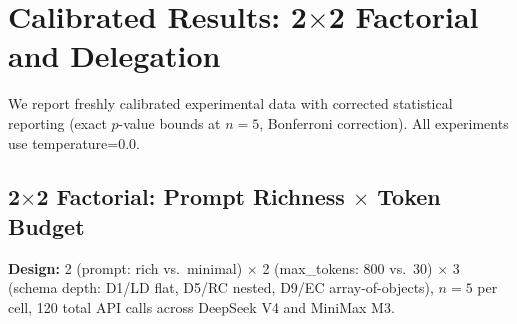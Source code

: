 \documentclass[11pt,a4paper]{article}
\begin{document}
\section{Calibrated Results: 2$\times$2 Factorial and Delegation}\label{sec:calibrated}

We report freshly calibrated experimental data with corrected statistical reporting (exact $p$-value bounds at $n=5$, Bonferroni correction). All experiments use temperature=0.0.

\subsection{2$\times$2 Factorial: Prompt Richness $\times$ Token Budget}

\textbf{Design:} 2 (prompt: rich vs.\ minimal) $\times$ 2 (max\_tokens: 800 vs.\ 30) $\times$ 3 (schema depth: D1/LD flat, D5/RC nested, D9/EC array-of-objects), $n=5$ per cell, 120 total API calls across DeepSeek V4 and MiniMax M3.

\begin{table}[htbp]\centering\caption{Calibrated 2$\times$2 Factorial Results}\label{tab:calibrated_2x2}\small
{}
\end{table}
\end{document}
